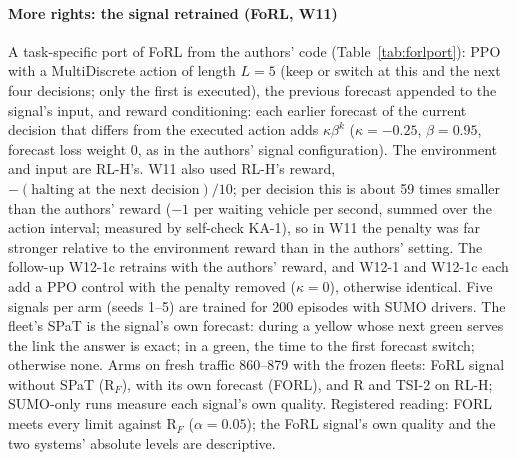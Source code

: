 \paragraph{More rights: the signal retrained (FoRL, W11)} A task-specific port of FoRL \cite{gerner2026forl} from the authors' code
(Table~\ref{tab:forlport}): PPO with a
MultiDiscrete action of length $L=5$ (keep or switch at this and the next four decisions; only the first is executed), the previous forecast
appended to the signal's input, and reward conditioning: each earlier forecast of the current decision that differs from the executed
action adds $\kappa\beta^{k}$ ($\kappa=-0.25$, $\beta=0.95$, forecast loss weight 0, as in the authors' signal configuration). The
environment and input are RL-H's. W11 also used RL-H's reward, $-(\text{halting at the next decision})/10$; per decision this is
about 59 times smaller than the authors' reward ($-1$ per waiting vehicle per second, summed over the action interval; measured by
self-check KA-1), so in W11 the penalty was far stronger relative to the environment reward than in the authors' setting. The follow-up
W12-1c retrains with the authors' reward, and W12-1 and W12-1c each add a PPO control with the penalty removed ($\kappa=0$), otherwise
identical. Five signals per arm (seeds 1--5) are trained for 200 episodes with SUMO drivers. The fleet's SPaT is
the signal's own forecast: during a yellow whose next green serves the link the answer is exact; in a green, the time to the first
forecast switch; otherwise none. Arms on fresh traffic 860--879 with the frozen fleets: FoRL signal without SPaT (R$_F$), with its own
forecast (FORL), and R and TSI-2 on RL-H; SUMO-only runs measure each signal's own quality. Registered reading: FORL meets every limit
against R$_F$ ($\alpha=0.05$); the FoRL signal's own quality and the two systems' absolute levels are descriptive.
